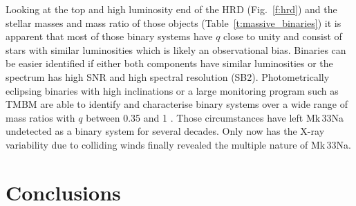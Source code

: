 \documentclass[fleqn,usenatbib]{mnras}
\begin{document}
Looking at the top and high luminosity end of the HRD (Fig.~\ref{f:hrd}) and the stellar masses and mass ratio of those objects (Table~\ref{t:massive_binaries}) it is apparent that most of those binary systems have $q$ close to unity and consist of stars with similar luminosities which is likely an observational bias. Binaries can be easier identified if either both components have similar luminosities or the spectrum has high SNR and high spectral resolution (SB2).  Photometrically eclipsing binaries with high inclinations or a large monitoring program such as TMBM are able to identify and characterise binary systems over a wide range of mass ratios with $q$ between 0.35 and 1 \citep[e.g.][Table~\ref{t:massive_binaries}]{massey2002, bonanos2009, mahy2020}. Those circumstances have left Mk\,33Na undetected as a binary system for several decades. Only now has the X-ray variability due to colliding winds finally revealed the multiple nature of Mk\,33Na.




\section{Conclusions}\label{conclusions}
\end{document}
